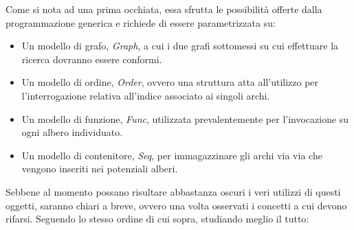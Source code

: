 Come si nota ad una prima occhiata, essa sfrutta le possibilità offerte dalla programmazione generica e richiede di essere parametrizzata su:
\begin{itemize}
 \item Un modello di grafo, \textit{Graph}, a cui i due grafi sottomessi su cui effettuare la ricerca dovranno essere conformi.
 \item Un modello di ordine, \textit{Order}, ovvero una struttura atta all'utilizzo per l'interrogazione relativa all'indice associato ai singoli archi.
 \item Un modello di funzione, \textit{Func}, utilizzata prevalentemente per l'invocazione su ogni albero individuato.
 \item Un modello di contenitore, \textit{Seq}, per immagazzinare gli archi via via che vengono inseriti nei potenziali alberi.
\end{itemize}
Sebbene al momento possano risultare abbastanza oscuri i veri utilizzi di questi oggetti, saranno chiari a breve, ovvero una volta osservati i concetti a cui devono rifarsi. Seguendo lo stesso ordine di cui sopra, studiando meglio il tutto:
